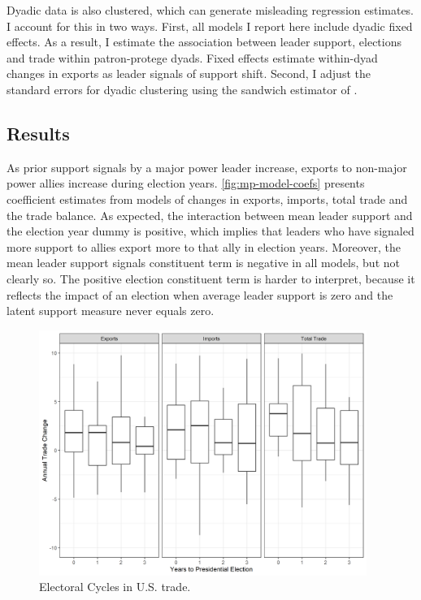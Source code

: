 \documentclass[12pt]{article}
\begin{document}
Dyadic data is also clustered, which can generate misleading regression estimates.
I account for this in two ways. 
First, all models I report here include dyadic fixed effects.
As a result, I estimate the association between leader support, elections and trade within patron-protege dyads. 
Fixed effects estimate within-dyad changes in exports as leader signals of support shift.
Second, I adjust the standard errors for dyadic clustering using the sandwich estimator of \citep{Aronowetal2015}.




\subsection{Results}


As prior support signals by a major power leader increase, exports to non-major power allies increase during election years. 
\autoref{fig:mp-model-coefs} presents coefficient estimates from models of changes in exports, imports, total trade and the trade balance. 
As expected, the interaction between mean leader support and the election year dummy is positive, which implies that leaders who have signaled more support to allies export more to that ally in election years. 
Moreover, the mean leader support signals constituent term is negative in all models, but not clearly so. 
The positive election constituent term is harder to interpret, because it reflects the impact of an election when average leader support is zero and the latent support measure never equals zero. 


\begin{figure}
\centering
\includegraphics[width=0.95\textwidth]{../figures/us-trade-cycles.png}
\caption{Electoral Cycles in U.S. trade.}
\label{fig:us-trade-cycles}
\end{figure}
\end{document}
